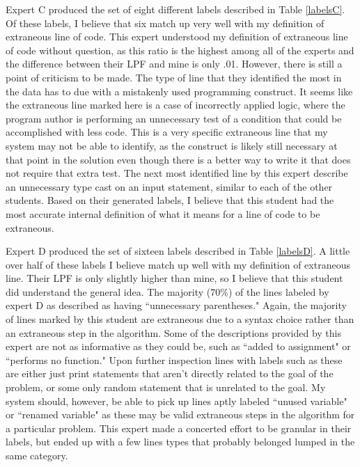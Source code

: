 \documentclass[draft]{article}
\begin{document}

\clearpage


Expert C produced the set of eight different labels described in Table \ref{labelsC}. Of these labels, I believe that six match up very well with my definition of extraneous line of code. This expert understood my definition of extraneous line of code without question, as this ratio is the highest among all of the experts and the difference between their LPF and mine is only .01. However, there is still a point of criticism to be made. The type of line that they identified the most in the data has to due with a mistakenly used programming construct. It seems like the extraneous line marked here is a case of incorrectly applied logic, where the program author is performing an unnecessary test of a condition that could be accomplished with less code. This is a very specific extraneous line that my system may not be able to identify, as the construct is likely still necessary at that point in the solution even though there is a better way to write it that does not require that extra test. The next most identified line by this expert describe an unnecessary type cast on an input statement, similar to each of the other students. Based on their generated labels, I believe that this student had the most accurate internal definition of what it means for a line of code to be extraneous. 



Expert D produced the set of sixteen labels described in Table \ref{labelsD}. A little over half of these labels I believe match up well with my definition of extraneous line. Their LPF is only slightly higher than mine, so I believe that this student did understand the general idea. The majority (70\%) of the lines labeled by expert D as described as having ``unnecessary parentheses." Again, the majority of lines marked by this student are extraneous due to a syntax choice rather than an extraneous step in the algorithm. Some of the descriptions provided by this expert are not as informative as they could be, such as ``added to assignment" or ``performs no function." Upon further inspection lines with labels such as these are either just print statements that aren't directly related to the goal of the problem, or some only random statement that is unrelated to the goal. My system should, however, be able to pick up lines aptly labeled ``unused variable" or ``renamed variable" as these may be valid extraneous steps in the algorithm for a particular problem. This expert made a concerted effort to be granular in their labels, but ended up with a few lines types that probably belonged lumped in the same category. 
\end{document}
